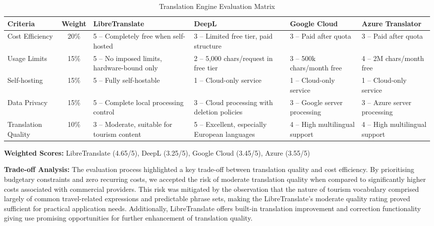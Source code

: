 \begin{table}[H]
\centering
\caption{Translation Engine Evaluation Matrix}
\begin{tabularx}{\textwidth}{l c Y Y Y Y}
\toprule
\textbf{Criteria} & \textbf{Weight} & \textbf{LibreTranslate} & \textbf{DeepL} & \textbf{Google Cloud} & \textbf{Azure Translator} \\
\midrule
Cost Efficiency & 20\% & 5 -- Completely free when self-hosted & 3 -- Limited free tier, paid structure & 3 -- Paid after quota & 3 -- Paid after quota \\
Usage Limits & 15\% & 5 -- No imposed limits, hardware-bound only & 2 -- 5{,}000 chars/request in free tier & 3 -- 500k chars/month free & 4 -- 2M chars/month free \\
Self-hosting & 15\% & 5 -- Fully self-hostable & 1 -- Cloud-only service & 1 -- Cloud-only service & 1 -- Cloud-only service \\
Data Privacy & 15\% & 5 -- Complete local processing control & 3 -- Cloud processing with deletion policies & 3 -- Google server processing & 3 -- Azure server processing \\
Translation Quality & 10\% & 3 -- Moderate, suitable for tourism content & 5 -- Excellent, especially European languages & 4 -- High multilingual support & 4 -- High multilingual support \\
\bottomrule
\end{tabularx}
\label{tab:translation-eval}
\end{table}

\textbf{Weighted Scores:} LibreTranslate (4.65/5), DeepL (3.25/5), Google Cloud (3.45/5), Azure (3.55/5)

\textbf{Trade-off Analysis:}
The evaluation process highlighted a key trade-off between translation quality and cost efficiency. By prioritising budgetary constraints and zero recurring costs, we accepted the risk of moderate translation quality when compared to significantly higher costs associated with commercial providers. This risk was mitigated by the observation that the nature of tourism vocabulary comprised largely of common travel-related expressions and predictable phrase sets, making the LibreTranslate's moderate quality rating proved sufficient for practical application needs\cite{libretranslate}. Additionally, LibreTranslate offers built-in translation improvement and correction functionality giving use promising opportunities for further enhancement of translation quality\cite{open-nmt}.